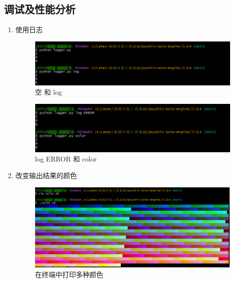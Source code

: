 \documentclass{ctexart}
\begin{document}
\subsection{调试及性能分析}
\begin{enumerate}
    \item 使用日志
\begin{figure}[H]
    \centering
    \includegraphics[width=14cm]{f0c8daaa91bc8a6d4159431336a4f244.png}
    \caption{空 和 log}
    \label{fig:1}
\end{figure}

\begin{figure}[H]
    \centering
    \includegraphics[width=14cm]{9571e16dc29fad803d55cc2b24eee718.png}
    \caption{log ERROR 和 color}
    \label{fig:2}
\end{figure}

\item 改变输出结果的颜色
\begin{figure}[H]
    \centering
    \includegraphics[width=14cm]{9cc3029c117e11aaf23ab16a4da10899.png}
    \caption{在终端中打印多种颜色}
    \label{fig:3}
    \end{figure}
\end{enumerate}
\end{document}
